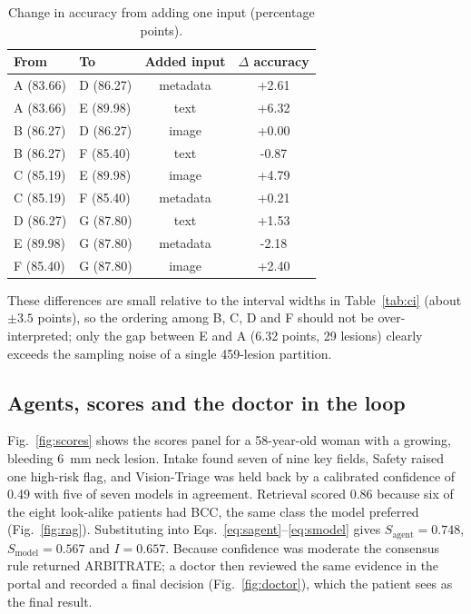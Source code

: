 \documentclass[conference]{IEEEtran}
\begin{document}
\begin{table}[!t]
\caption{Change in accuracy from adding one input (percentage points).}
\label{tab:gain}
\centering\scriptsize\setlength{\tabcolsep}{2.4pt}
\begin{tabular}{llcc}
\toprule
From & To & Added input & $\Delta$ accuracy \\
\midrule
A (83.66) & D (86.27) & metadata & +2.61 \\
A (83.66) & E (89.98) & text & +6.32 \\
B (86.27) & D (86.27) & image & +0.00 \\
B (86.27) & F (85.40) & text & -0.87 \\
C (85.19) & E (89.98) & image & +4.79 \\
C (85.19) & F (85.40) & metadata & +0.21 \\
D (86.27) & G (87.80) & text & +1.53 \\
E (89.98) & G (87.80) & metadata & -2.18 \\
F (85.40) & G (87.80) & image & +2.40 \\
\bottomrule
\end{tabular}
\end{table}


These differences are small relative to the interval widths in Table~\ref{tab:ci} (about $\pm3.5$ points), so the ordering among B, C, D and F should not be over-interpreted; only the gap between E and A (6.32 points, 29 lesions) clearly exceeds the sampling noise of a single 459-lesion partition.

\subsection{Agents, scores and the doctor in the loop}
Fig.~\ref{fig:scores} shows the scores panel for a 58-year-old woman with a growing, bleeding 6~mm neck lesion. Intake found seven of nine key fields, Safety raised one high-risk flag, and Vision-Triage was held back by a calibrated confidence of 0.49 with five of seven models in agreement. Retrieval scored 0.86 because six of the eight look-alike patients had BCC, the same class the model preferred (Fig.~\ref{fig:rag}). Substituting into Eqs.~\eqref{eq:sagent}--\eqref{eq:smodel} gives $S_{\mathrm{agent}}=0.748$, $S_{\mathrm{model}}=0.567$ and $I=0.657$. Because confidence was moderate the consensus rule returned ARBITRATE; a doctor then reviewed the same evidence in the portal and recorded a final decision (Fig.~\ref{fig:doctor}), which the patient sees as the final result.
\end{document}
